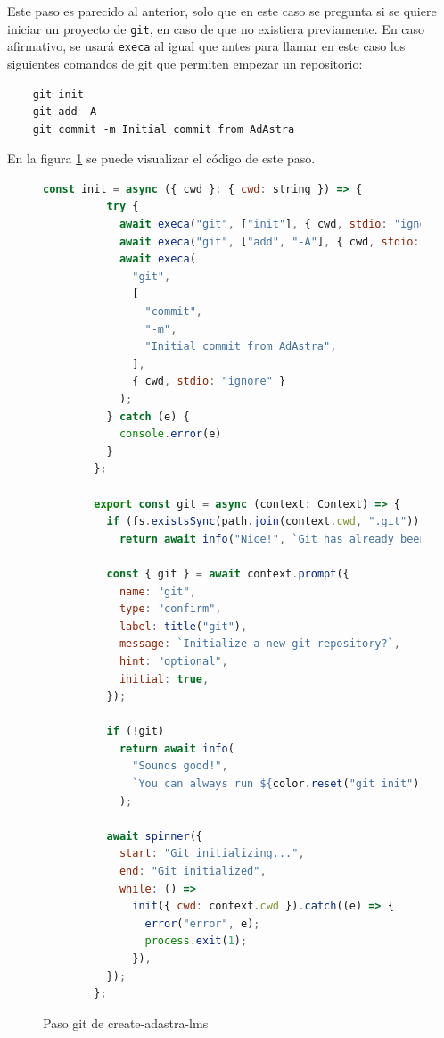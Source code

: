 Este paso es parecido al anterior, solo que en este caso se pregunta si se quiere iniciar un proyecto de \verb|git|\cite{git}, en caso de que no existiera previamente. En caso afirmativo, se usará \verb|execa| al igual que antes para llamar en este caso los siguientes comandos de git que permiten empezar un repositorio:
\begin{verbatim}
    git init
    git add -A
    git commit -m Initial commit from AdAstra 
\end{verbatim}

En la figura \ref{fig:adastraCreateGit} se puede visualizar el código de este paso.

\begin{figure}
    \begin{lstlisting}[language=Javascript]
        const init = async ({ cwd }: { cwd: string }) => {
          try {
            await execa("git", ["init"], { cwd, stdio: "ignore" });
            await execa("git", ["add", "-A"], { cwd, stdio: "ignore" });
            await execa(
              "git",
              [
                "commit",
                "-m",
                "Initial commit from AdAstra",
              ],
              { cwd, stdio: "ignore" }
            );
          } catch (e) {
            console.error(e)
          }
        };
        
        export const git = async (context: Context) => {
          if (fs.existsSync(path.join(context.cwd, ".git")))
            return await info("Nice!", `Git has already been initialized`);
        
          const { git } = await context.prompt({
            name: "git",
            type: "confirm",
            label: title("git"),
            message: `Initialize a new git repository?`,
            hint: "optional",
            initial: true,
          });
        
          if (!git)
            return await info(
              "Sounds good!",
              `You can always run ${color.reset("git init")}${color.dim(" manually.")}`
            );
        
          await spinner({
            start: "Git initializing...",
            end: "Git initialized",
            while: () =>
              init({ cwd: context.cwd }).catch((e) => {
                error("error", e);
                process.exit(1);
              }),
          });
        };
    \end{lstlisting}
    \caption{Paso git de create-adastra-lms}
    \label{fig:adastraCreateGit}
\end{figure}

